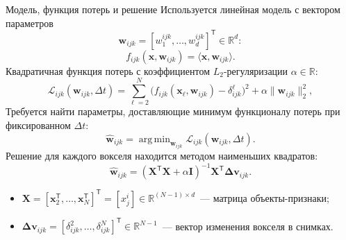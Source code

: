 \documentclass[10pt]{beamer}
\newcommand{\bx}{\mathbf{x}}
\newcommand{\bw}{\mathbf{w}}
\newcommand{\bX}{\mathbf{X}}
\newcommand{\T}{^{\mathsf{T}}}
\DeclareMathOperator*{\argmin}{arg\,min}  %
\begin{document}
\begin{frame}{Модель, функция потерь и решение}
    Используется линейная модель с вектором параметров 
	\[ \mathbf{w}_{ijk} = [w^{ijk}_1, \ldots, w^{ijk}_{d}]\T \in \mathbb{R}^{d}: \]
	\begin{equation*}
		\label{eq5}
		f_{ijk}(\mathbf{x}, \mathbf{w}_{ijk}) = \langle \mathbf{x}, \mathbf{w}_{ijk} \rangle.
	\end{equation*}
    Квадратичная функция потерь с коэффициентом $L_2$-регуляризации $\alpha \in \mathbb{R}$:
	\begin{equation*}
		\label{eq6}
		\mathcal{L}_{ijk}(\mathbf{w}_{ijk}, \Delta t) = \sum\limits_{\ell = 2}^{N} \big(f_{ijk}(\mathbf{x}_{\ell}, \mathbf{w}_{ijk}) - \delta^{\ell}_{ijk}\big)^2 + \alpha \| \mathbf{w}_{ijk} \|_2^2,
	\end{equation*}
    Требуется найти параметры, доставляющие минимум функционалу потерь при фиксированном $\Delta t$:
    \begin{equation*}
        \label{eq7}
        \hat{\mathbf{w}}_{ijk} = \argmin_{\mathbf{w}_{ijk}} \mathcal{L}_{ijk}(\mathbf{w}_{ijk}, \Delta t).
    \end{equation*}
    Решение для каждого вокселя находится методом наименьших квадратов:
    \begin{equation*}
		\label{eq8}
		\hat{\bw}_{ijk} = (\bX\T \bX + \alpha \mathbf{I})^{-1} \bX\T \mathbf{\Delta v}_{ijk}.
	\end{equation*}
    \vspace{-0.5cm}
    \begin{itemize}
        \item $\bX = [\bx_2\T, \ldots, \bx_N\T]\T = [x^i_j] \in \mathbb{R}^{(N-1) \times d}$~--- матрица объекты-признаки;
        \item $\mathbf{\Delta v}_{ijk} = [\delta^2_{ijk}, \ldots, \delta^N_{ijk}]\T \in \mathbb{R}^{N-1}$~--- вектор изменения вокселя в снимках.
    \end{itemize}
\end{frame}
\end{document}
